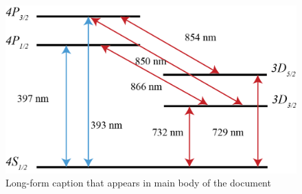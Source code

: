 \begin{figure}[h!]

\centering

\includegraphics[width=.8\textwidth]{Chapters/Figures/calcium_levels_1-1.PNG}

\caption[Short-form caption]{Long-form caption that appears in main body of the document}

\label{fig:aFigure}
\end{figure}



